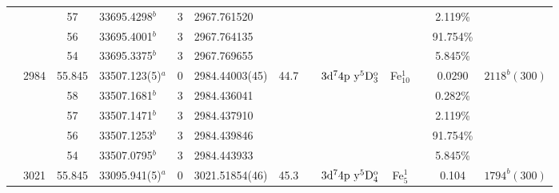 \begin{table*}
\begin{center}
{\begin{tabular}{:l;l;c;l;c;l;c;l;l;c;c;c;c}
\rowstyle{\itshape}               &        & 57        & 33695.4298$^{b}$                 & 3 &   2967.761520      &      & $                                        $ & $                                        $ &             &              & 2.119\%   & $     ^{}     $\\
\rowstyle{\itshape}               &        & 56        & 33695.4001$^{b}$                 & 3 &   2967.764135      &      & $                                        $ & $                                        $ &             &              & 91.754\%  & $     ^{}     $\\
\rowstyle{\itshape}               &        & 54        & 33695.3375$^{b}$                 & 3 &   2967.769655      &      & $                                        $ & $                                        $ &             &              & 5.845\%   & $     ^{}     $\\
                                  & 2984   & 55.845    & 33507.123(5)$^{a}$               & 0 &    2984.44003(45)  & 44.7 & $                                        $ & $3\rm{d}^74\rm{p~y}^5\rm{D}_{3}^{\rm o}  $ & Fe$^1_{10}$ &              & 0.0290    & $ 2118^{b}(300)$\\
\rowstyle{\itshape}               &        & 58        & 33507.1681$^{b}$                 & 3 &   2984.436041      &      & $                                        $ & $                                        $ &             &              & 0.282\%   & $     ^{}     $\\
\rowstyle{\itshape}               &        & 57        & 33507.1471$^{b}$                 & 3 &   2984.437910      &      & $                                        $ & $                                        $ &             &              & 2.119\%   & $     ^{}     $\\
\rowstyle{\itshape}               &        & 56        & 33507.1253$^{b}$                 & 3 &   2984.439846      &      & $                                        $ & $                                        $ &             &              & 91.754\%  & $     ^{}     $\\
\rowstyle{\itshape}               &        & 54        & 33507.0795$^{b}$                 & 3 &   2984.443933      &      & $                                        $ & $                                        $ &             &              & 5.845\%   & $     ^{}     $\\
                                  & 3021   & 55.845    & 33095.941(5)$^{a}$               & 0 &    3021.51854(46)  & 45.3 & $                                        $ & $3\rm{d}^74\rm{p~y}^5\rm{D}_{4}^{\rm o}  $ & Fe$^1_{5}$  &              & 0.104     & $ 1794^{b}(300)$\\

\end{tabular}}
\end{center}
\end{table*}
